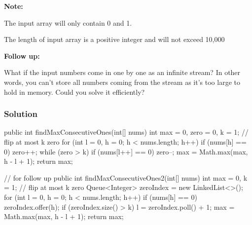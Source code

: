 \textbf{Note:}

The input array will only contain 0 and 1.

The length of input array is a positive integer and will not exceed 10,000

\textbf{Follow up:}

What if the input numbers come in one by one as an infinite stream? In other words, you can't store all numbers coming from the stream as it's too large to hold in memory. Could you solve it efficiently?
\subsubsection{Solution}

\begin{Code}
public int findMaxConsecutiveOnes(int[] nums) {
    int max = 0, zero = 0, k = 1; // flip at most k zero
    for (int l = 0, h = 0; h < nums.length; h++) {
        if (nums[h] == 0)
            zero++;
        while (zero > k)
            if (nums[l++] == 0)
                zero--;
        max = Math.max(max, h - l + 1);
    }
    return max;
}

// for follow up
public int findMaxConsecutiveOnes2(int[] nums) {
    int max = 0, k = 1; // flip at most k zero
    Queue<Integer> zeroIndex = new LinkedList<>();
    for (int l = 0, h = 0; h < nums.length; h++) {
        if (nums[h] == 0)
            zeroIndex.offer(h);
        if (zeroIndex.size() > k)
            l = zeroIndex.poll() + 1;
        max = Math.max(max, h - l + 1);
    }
    return max;
}
\end{Code}

\newpage